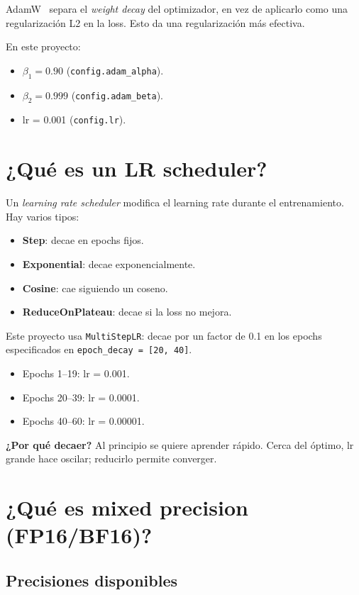 AdamW~\cite{loshchilov2019adamw} separa el \emph{weight decay}
del optimizador, en vez de aplicarlo como una regularización L2
en la loss. Esto da una regularización más efectiva.

En este proyecto:
\begin{itemize}
  \item $\beta_1 = 0.90$ (\texttt{config.adam\_alpha}).
  \item $\beta_2 = 0.999$ (\texttt{config.adam\_beta}).
  \item lr = 0.001 (\texttt{config.lr}).
\end{itemize}

\section{¿Qué es un LR scheduler?}

Un \emph{learning rate scheduler} modifica el learning rate
durante el entrenamiento. Hay varios tipos:

\begin{itemize}
  \item \textbf{Step}: decae en epochs fijos.
  \item \textbf{Exponential}: decae exponencialmente.
  \item \textbf{Cosine}: cae siguiendo un coseno.
  \item \textbf{ReduceOnPlateau}: decae si la loss no mejora.
\end{itemize}

\noindent Este proyecto usa \texttt{MultiStepLR}: decae por un
factor de 0.1 en los epochs especificados en
\texttt{epoch\_decay = [20, 40]}.

\begin{itemize}
  \item Epochs 1--19: lr = 0.001.
  \item Epochs 20--39: lr = 0.0001.
  \item Epochs 40--60: lr = 0.00001.
\end{itemize}

\noindent\textbf{¿Por qué decaer?} Al principio se quiere
aprender rápido. Cerca del óptimo, lr grande hace oscilar;
reducirlo permite converger.

\section{¿Qué es mixed precision (FP16/BF16)?}

\subsection{Precisiones disponibles}

